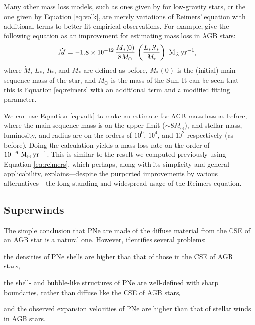 \documentclass[twocolumn]{aastex63}
\begin{document}
Many other mass loss models, such as ones given by \cite{schroeder} for low-gravity stars, or the one given by Equation \ref{eq:volk}, are merely variations of Reimers' equation with additional terms to better fit empirical observations. For example, \cite{volk} give the following equation as an improvement for estimating mass loss in AGB stars:
\begin{equation}\label{eq:volk}
    \dot M = -1.8 \times 10^{-12}\, \frac{M_*(0)}{8M_\odot}\, \left(\frac{L_*R_*}{M_*}\right)~{\rm M_\odot\,yr^{-1}},
\end{equation}
where $\dot M$, $L_*$, $R_*$, and $M_*$ are defined as before, $M_*(0)$ is the (initial) main sequence mass of the star, and $M_\odot$ is the mass of the Sun. It can be seen that this is Equation \ref{eq:reimers} with an additional term and a modified fitting parameter. 

We can use Equation \ref{eq:volk} to make an estimate for AGB mass loss as before, where the main sequence mass is on the upper limit ($\sim 8 M_\odot$), and stellar mass, luminosity, and radius are on the orders of $10^0$, $10^4$, and $10^2$ respectively (as before). Doing the calculation yields a mass loss rate on the order of $10^{-6}~{\rm M_\odot\,yr^{-1}}$. This is similar to the result we computed previously using Equation \ref{eq:reimers}, which perhaps, along with its simplicity and general applicability, explains—despite the purported improvements by various alternatives—the long-standing and widespread usage of the Reimers equation. 


\hfill\vspace{-0.2cm}
\subsection{Superwinds} \label{subsec:superwinds}

The simple conclusion that PNe are made of the diffuse material from the CSE of an AGB star is a natural one. However, \cite{kwok2000} identifies several problems: 
\begin{enumerate*}[label=(\roman*)]
    \item the densities of PNe shells are higher than that of those in the CSE of AGB stars,
    \item the shell- and bubble-like structures of PNe are well-defined with sharp boundaries, rather than diffuse like the CSE of AGB stars, 
    \item and the observed expansion velocities of PNe are higher than that of stellar winds in AGB stars. 
\end{enumerate*}
\end{document}
